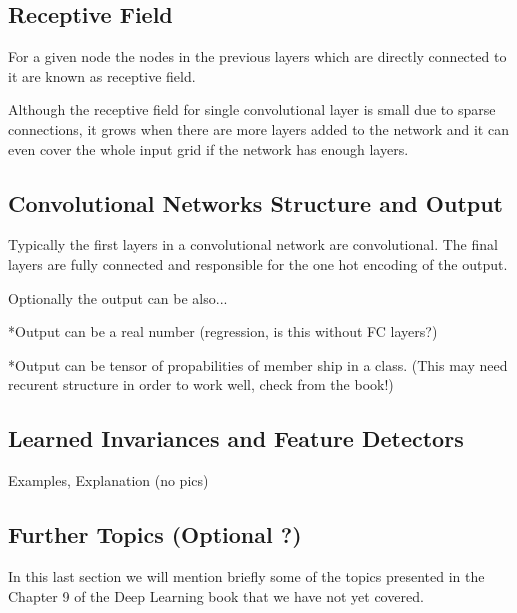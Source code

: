 \documentclass[]{article}
\begin{document}
\subsection{Receptive Field}
For a given node the nodes in the previous layers which are directly connected
to it are known as receptive field.

Although the receptive field for single convolutional layer is small due to sparse
connections, it grows when there are more layers added to the network and it can
even cover the whole input grid if the network has enough layers.

\subsection{Convolutional Networks Structure and Output}
Typically the first layers in a convolutional network are convolutional. The final
layers are fully connected and responsible for the one hot encoding of the output.

Optionally the output can be also...

*Output can be a real number (regression, is this without FC layers?)

*Output can be tensor of propabilities of member ship in a class. (This may need
recurent structure in order to work well, check from the book!)


\subsection{Learned Invariances and Feature Detectors}
Examples, Explanation (no pics)

%

\subsection{Further Topics (Optional ?)}
In this last section we will mention briefly some of the topics presented in the
Chapter 9 of the Deep Learning book that we have not yet covered.
\end{document}
